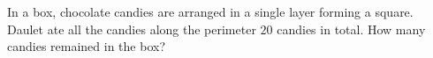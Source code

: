 In a box, chocolate candies are arranged in a single layer forming a square. Daulet ate all the candies along the perimeter $20$ candies in total. How many candies remained in the box?
